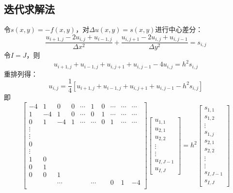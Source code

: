 \documentclass[fontset=mac]{ctexart}
\begin{document}
	\subsection{迭代求解法}
	令$s(x,y)=-f(x,y)$，对$\Delta u (x,y)=s(x,y)$进行中心差分：
	$$
	\frac{u_{i+1, j}-2 u_{i, j}+u_{i-1, j}}{\Delta x^{2}}+\frac{u_{i, j+1}-2 u_{i, j}+u_{i, j-1}}{\Delta y^{2}}=s_{i, j}
	$$
	令$I=J$，则
	$$
	u_{i+1, j}+u_{i-1, j}+u_{i, j+1}+u_{i, j-1}-4 u_{i, j}=h^{2} s_{i, j}
	$$
	重排列得：
	$$
	u_{i, j}=\frac{1}{4}\left[u_{i+1, j}+u_{i-1, j}+u_{i, j+1}+u_{i, j-1}-h^{2} s_{i, j}\right]
	$$
	即
	$$
	\left[\begin{array}{cccccccccc}
		-4 & 1 & 0 & 0 & \cdots & 1 & 0 & \cdots & \cdots & \cdots \\
		1 & -4 & 1 & 0 & \cdots & 0 & 1 & \cdots & \cdots & \cdots \\
		0 & 1 & -4 & 1 & \cdots & \cdots & 0 & 1 & \cdots & \cdots \\
		\vdots & & & & & \\
		\vdots & & & & & \\
		0 & & & & \\
		\vdots & & & & \\
		1 & 0 & & & \\
		0 & 1 & & \\
		0 & 0 & 1 & & \\
		& & \cdots & & & \cdots & & 0 & 1 & -4\\
	\end{array}\right]
	\left[\begin{array}{c}
		u_{1,1} \\
		u_{2,1} \\
		u_{2,2} \\
		\vdots \\
		\vdots \\
		u_{I, J-1} \\
		u_{I, J}
	\end{array}\right]
	=h^2\left[\begin{array}{c}
		s_{1,1} \\
		s_{1,2} \\
		\vdots \\
		s_{1, j} \\
		s_{2,1} \\
		s_{2,2} \\
		\vdots \\
		\vdots \\
		s_{I, J-1} \\
		s_{I, J}
	\end{array}\right]
	$$
\end{document}
